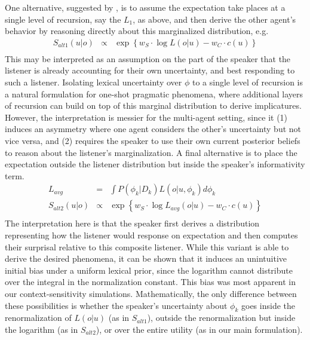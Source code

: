 \documentclass[11pt, floatsintext]{apa6}
\begin{document}
One alternative, suggested by , is to assume the expectation take places at a single level of recursion, say the $L_1$, as above, and then derive the other agent's behavior by reasoning directly about this marginalized distribution, e.g.
$$
\begin{array}{rcl}
S_{alt1}(u|o) & \propto & \exp\left\{w_S \cdot \log L(o|u) - w_C \cdot c(u)\right\} \\
\end{array}
$$
This may be interpreted as an assumption on the part of the speaker that the listener is already accounting for their own uncertainty, and best responding to such a listener.
Isolating lexical uncertainty over $\phi$ to a single level of recursion is a natural formulation for one-shot pragmatic phenomena, where additional layers of recursion can build on top of this marginal distribution to derive implicatures.
However, the interpretation is messier for the multi-agent setting, since it (1) induces an asymmetry where one agent considers the other's uncertainty but not vice versa, and (2) requires the speaker to use their own current posterior beliefs to reason about the listener's marginalization.
A final alternative is to place the expectation outside the listener distribution but inside the speaker's informativity term.
$$
\begin{array}{rcl}
L_{avg} & = & \int P(\phi_k | D_k) L(o|u, \phi_k) d\phi_k \\
S_{alt2}(u|o) & \propto & \exp\left\{w_S \cdot \log L_{avg}(o|u) - w_C \cdot c(u)\right\} \\
\end{array}
$$
The interpretation here is that the speaker first derives a distribution representing how the listener would response on expectation and then computes their surprisal relative to this composite listener.
While this variant is able to derive the desired phenomena, it can be shown that it induces an unintuitive initial bias under a uniform lexical prior, since the logarithm cannot distribute over the integral in the normalization constant. 
This bias was most apparent in our context-sensitivity simulations.
Mathematically, the only difference between these possibilities is whether the speaker's uncertainty about $\phi_k$ goes inside the renormalization of $L(o|u)$ (as in $S_{alt1}$), outside the renormalization but inside the logarithm (as in $S_{alt2}$), or over the entire utility (as in our main formulation).
 
\end{document}
